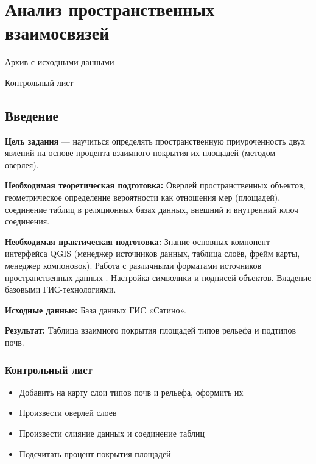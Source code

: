 \documentclass[
  12pt,
]{book}
\providecommand{\tightlist}{%
  \setlength{\itemsep}{0pt}\setlength{\parskip}{0pt}}
\begin{document}
\hypertarget{overlay}{%
\chapter{Анализ пространственных взаимосвязей}\label{overlay}}

\href{https://github.com/aentin/qgis-course/raw/master/files/Ex07.zip}{Архив с исходными данными}

\href{https://github.com/aentin/qgis-course/raw/master/files/Ex07_\%D0\%BE\%D1\%82\%D1\%87\%D1\%91\%D1\%82.docx}{Контрольный лист}

\hypertarget{overlay-intro}{%
\section{Введение}\label{overlay-intro}}

\textbf{Цель задания} --- научиться определять пространственную приуроченность двух явлений на основе процента взаимного покрытия их площадей (методом оверлея).

\textbf{Необходимая теоретическая подготовка:} Оверлей пространственных объектов, геометрическое определение вероятности как отношения мер (площадей), соединение таблиц в реляционных базах данных, внешний и внутренний ключ соединения.

\textbf{Необходимая практическая подготовка:} Знание основных компонент интерфейса QGIS (менеджер источников данных, таблица слоёв, фрейм карты, менеджер компоновок). Работа с различными форматами источников пространственных данных . Настройка символики и подписей объектов. Владение базовыми ГИС-технологиями.

\textbf{Исходные данные:} База данных ГИС «Сатино».

\textbf{Результат:} Таблица взаимного покрытия площадей типов рельефа и подтипов почв.

\hypertarget{overlay-control}{%
\subsection{Контрольный лист}\label{overlay-control}}

\begin{itemize}
\tightlist
\item
  Добавить на карту слои типов почв и рельефа, оформить их
\item
  Произвести оверлей слоев
\item
  Произвести слияние данных и соединение таблиц
\item
  Подсчитать процент покрытия площадей
\end{itemize}
\end{document}
